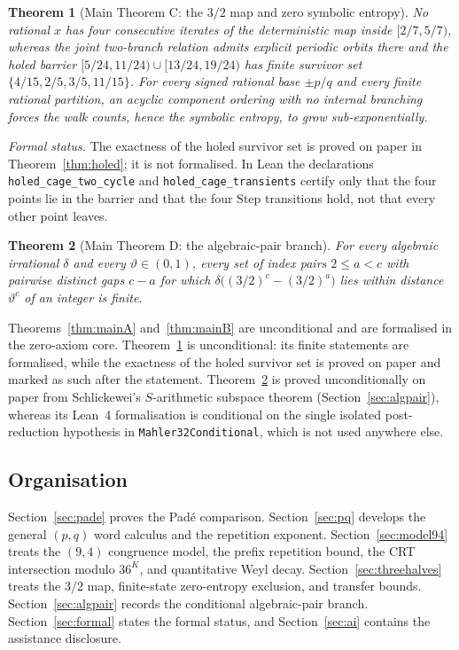 \documentclass[11pt,a4paper]{article}
\newtheorem{theorem}{Theorem}[section]
\theoremstyle{remark}
\begin{document}
\begin{theorem}[Main Theorem C: the $3/2$ map and zero symbolic entropy]
\label{thm:mainC}
No rational $x$ has four consecutive iterates of the deterministic map inside $[2/7,5/7)$, whereas the joint two-branch relation admits explicit periodic orbits there and the holed barrier $[5/24,11/24) \cup [13/24,19/24)$ has finite survivor set $\{4/15, 2/5, 3/5, 11/15\}$. For every signed rational base $\pm p/q$ and every finite rational partition, an acyclic component ordering with no internal branching forces the walk counts, hence the symbolic entropy, to grow sub-exponentially.
\end{theorem}

\noindent\emph{Formal status.} The exactness of the holed survivor set is proved on paper in Theorem~\ref{thm:holed}; it is not formalised. In Lean the declarations \texttt{holed\_cage\_two\_cycle} and \texttt{holed\_cage\_transients} certify only that the four points lie in the barrier and that the four $\mathrm{Step}$ transitions hold, not that every other point leaves.

\begin{theorem}[Main Theorem D: the algebraic-pair branch]
\label{thm:mainD}
For every algebraic irrational $\delta$ and every $\vartheta \in (0,1)$, every set of index pairs $2 \le a < c$ with pairwise distinct gaps $c-a$ for which $\delta\bigl((3/2)^{c} - (3/2)^{a}\bigr)$ lies within distance $\vartheta^{c}$ of an integer is finite.
\end{theorem}

Theorems~\ref{thm:mainA} and~\ref{thm:mainB} are unconditional and are formalised in the zero-axiom core. Theorem~\ref{thm:mainC} is unconditional: its finite statements are formalised, while the exactness of the holed survivor set is proved on paper and marked as such after the statement. Theorem~\ref{thm:mainD} is proved unconditionally on paper from Schlickewei's $S$-arithmetic subspace theorem (Section~\ref{sec:algpair}), whereas its Lean~4 formalisation is conditional on the single isolated post-reduction hypothesis in \texttt{Mahler32Conditional}, which is not used anywhere else.

\subsection{Organisation}

Section~\ref{sec:pade} proves the Pad\'e comparison. Section~\ref{sec:pq} develops the general $(p,q)$ word calculus and the repetition exponent. Section~\ref{sec:model94} treats the $(9,4)$ congruence model, the prefix repetition bound, the CRT intersection modulo $36^{K}$, and quantitative Weyl decay. Section~\ref{sec:threehalves} treats the $3/2$ map, finite-state zero-entropy exclusion, and transfer bounds. Section~\ref{sec:algpair} records the conditional algebraic-pair branch. Section~\ref{sec:formal} states the formal status, and Section~\ref{sec:ai} contains the assistance disclosure.
\end{document}
